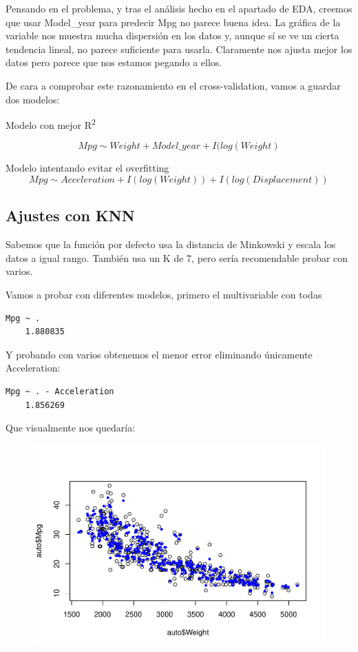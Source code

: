 Pensando en el problema, y tras el análisis hecho en el apartado de EDA, creemos que usar Model\_year para predecir Mpg no parece buena idea. La gráfica de la variable nos muestra mucha dispersión en los datos y, aunque sí se ve un cierta tendencia lineal, no parece suficiente para usarla. Claramente nos ajusta mejor los datos pero parece que nos estamos pegando a ellos.

De cara a comprobar este razonamiento en el cross-validation, vamos a guardar dos modelos: 

\vspace{\baselineskip}
Modelo con mejor R\textsuperscript{2} 

\begin{equation}    
    Mpg \sim Weight + Model\_year + I(log(Weight)
\end{equation}

Modelo intentando evitar el overfitting
\begin{equation}    
    Mpg \sim Acceleration + I(log(Weight)) + I(log(Displacement))
\end{equation}

\subsection{Ajustes con KNN}

Sabemos que la función por defecto usa la distancia de Minkowski y escala los datos a igual rango. También usa un K de 7, pero sería recomendable probar con varios.

\vspace{\baselineskip}

Vamos a probar con diferentes modelos, primero el multivariable con todas
\begin{verbatim}
Mpg ~ .
    1.880835
\end{verbatim}

Y probando con varios obtenemos el menor error eliminando únicamente Acceleration:
\begin{verbatim}
Mpg ~ . - Acceleration    
    1.856269
\end{verbatim}

Que visualmente nos quedaría:
\begin{figure}[H]\includegraphics[width=.9\linewidth]{img/Regresion_files/figure-latex/unnamed-chunk-29-1} \caption{}\end{figure}

